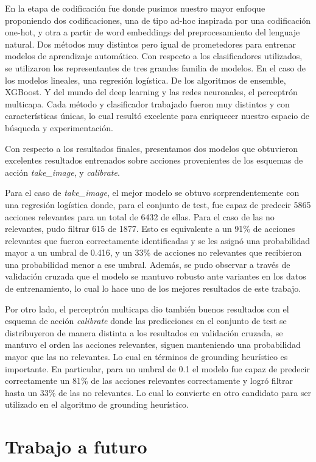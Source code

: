 En la etapa de codificación fue donde pusimos nuestro mayor enfoque proponiendo
dos codificaciones, una de tipo ad-hoc inspirada por una codificación one-hot, y
otra a partir de word embeddings del preprocesamiento del lenguaje natural. Dos
métodos muy distintos pero igual de prometedores para entrenar modelos de
aprendizaje automático. Con respecto a los clasificadores utilizados, se
utilizaron los representantes de tres grandes familia de modelos. En el caso de
los modelos lineales, una regresión logística. De los algoritmos de ensemble,
XGBoost. Y del mundo del deep learning y las redes neuronales, el perceptrón
multicapa. Cada método y clasificador trabajado fueron muy distintos y con
características únicas, lo cual resultó excelente para enriquecer nuestro
espacio de búsqueda y experimentación.

Con respecto a los resultados finales, presentamos dos modelos que obtuvieron
excelentes resultados entrenados sobre acciones provenientes de los esquemas de
acción \emph{take\_image}, y \emph{calibrate}.

Para el caso de \emph{take\_image}, el mejor modelo se obtuvo sorprendentemente
con una regresión logística donde, para el conjunto de test, fue capaz de
predecir 5865 acciones relevantes para un total de 6432 de ellas. Para el caso
de las no relevantes, pudo filtrar 615 de 1877. Esto es equivalente a un 91\% de
acciones relevantes que fueron correctamente identificadas y se les asignó una
probabilidad mayor a un umbral de 0.416, y un 33\% de acciones no relevantes que
recibieron una probabilidad menor a ese umbral. Además, se pudo observar a
través de validación cruzada que el modelo se mantuvo robusto ante variantes en
los datos de entrenamiento, lo cual lo hace uno de los mejores resultados de
este trabajo.

Por otro lado, el perceptrón multicapa dio también buenos resultados con el
esquema de acción \emph{calibrate} donde las predicciones en el conjunto de test
se distribuyeron de manera distinta a los resultados en validación cruzada, se
mantuvo el orden las acciones relevantes, siguen manteniendo una probabilidad
mayor que las no relevantes. Lo cual en términos de grounding heurístico es
importante. En particular, para un umbral de 0.1 el modelo fue capaz de predecir
correctamente un 81\% de las acciones relevantes correctamente y logró filtrar
hasta un 33\% de las no relevantes. Lo cual lo convierte en otro candidato para
ser utilizado en el algoritmo de grounding heurístico.

\section{Trabajo a futuro}

